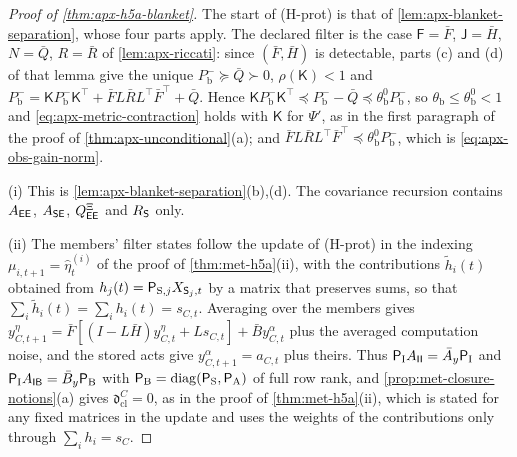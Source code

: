 \begin{proof}[Proof of \cref{thm:apx-h5a-blanket}]
The start of (H-prot) is that of \cref{lem:apx-blanket-separation}, whose four parts apply. The declared filter is the case $\mathsf F=\bar F$, $\mathsf J=\bar H$, $N=\bar Q$, $R=\bar R$ of \cref{lem:apx-riccati}: since $(\bar F,\bar H)$ is detectable, parts (c) and (d) of that lemma give the unique $P^-_{\mathrm b}\succeq\bar Q\succ0$, $\rho(\mathsf K)<1$ and $P^-_{\mathrm b}=\mathsf KP^-_{\mathrm b}\mathsf K^\top+\bar FL\bar RL^\top\bar F^\top+\bar Q$. Hence $\mathsf KP^-_{\mathrm b}\mathsf K^\top\preceq P^-_{\mathrm b}-\bar Q\preceq\theta^0_{\mathrm b}P^-_{\mathrm b}$, so $\theta_{\mathrm b}\le\theta^0_{\mathrm b}<1$ and \cref{eq:apx-metric-contraction} holds with $\mathsf K$ for $\Psi'$, as in the first paragraph of the proof of \cref{thm:apx-unconditional}(a); and $\bar FL\bar RL^\top\bar F^\top\preceq\theta^0_{\mathrm b}P^-_{\mathrm b}$, which is \eqref{eq:apx-obs-gain-norm}.

(i) This is \cref{lem:apx-blanket-separation}(b),(d). The covariance recursion contains $A_{\mathsf{E}\mathsf{E}}$, $A_{\mathsf{S}\mathsf{E}}$, $Q^{\Xi}_{\mathsf{E}\mathsf{E}}$ and $R_{\mathsf{S}}$ only.

(ii) The members' filter states follow the update of (H-prot) in the indexing $\mu_{i,t+1}=\hat\eta^{(i)}_t$ of the proof of \cref{thm:met-h5a}(ii), with the contributions $\tilde h_i(t)$ obtained from $h_j(t)=\mathsf P_{\mathrm S,j}X_{\mathsf{S}_j,t}$ by a matrix that preserves sums, so that $\sum_i\tilde h_i(t)=\sum_ih_i(t)=s_{C,t}$. Averaging over the members gives $y^\eta_{C,t+1}=\bar F[(I-L\bar H)y^\eta_{C,t}+Ls_{C,t}]+\bar By^\alpha_{C,t}$ plus the averaged computation noise, and the stored acts give $y^\alpha_{C,t+1}=a_{C,t}$ plus theirs. Thus $\mathsf P_{\mathrm I}A_{\mathsf{I}\mathsf{I}}=\bar A_y\mathsf P_{\mathrm I}$ and $\mathsf P_{\mathrm I}A_{\mathsf{I}\mathsf{B}}=\bar B_y\mathsf P_{\mathrm B}$ with $\mathsf P_{\mathrm B}=\operatorname{diag}(\mathsf P_{\mathrm S},\mathsf P_{\mathrm A})$ of full row rank, and \cref{prop:met-closure-notions}(a) gives $\mathfrak d^C_{\mathrm{cl}}=0$, as in the proof of \cref{thm:met-h5a}(ii), which is stated for any fixed matrices in the update and uses the weights of the contributions only through $\sum_ih_i=s_C$.


\end{proof}
